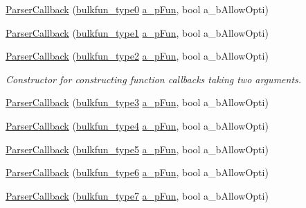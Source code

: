 \begin{DoxyCompactItemize}
\item 
\hyperlink{classmu_1_1_parser_callback_a635bce0e512570b3fc58a0c518c0a670}{Parser\+Callback} (\hyperlink{namespacemu_aff9adf757e90a2398326a3cb10585cf1}{bulkfun\+\_\+type0} \hyperlink{mu_parser_d_l_l_8h_ab3a3ed85edf393f2b8ad69081fe538e8}{a\+\_\+p\+Fun}, bool a\+\_\+b\+Allow\+Opti)
\item 
\hyperlink{classmu_1_1_parser_callback_ae5e973a9b5b89d6cae23b43a0c3b3d34}{Parser\+Callback} (\hyperlink{namespacemu_a2bd588710432e6e34eae3e2af4ba3862}{bulkfun\+\_\+type1} \hyperlink{mu_parser_d_l_l_8h_ab3a3ed85edf393f2b8ad69081fe538e8}{a\+\_\+p\+Fun}, bool a\+\_\+b\+Allow\+Opti)
\item 
\hyperlink{classmu_1_1_parser_callback_a442aafc38e0ea41313c1113aadaccbed}{Parser\+Callback} (\hyperlink{namespacemu_a9faa755ea34c6e8de3895013e649a713}{bulkfun\+\_\+type2} \hyperlink{mu_parser_d_l_l_8h_ab3a3ed85edf393f2b8ad69081fe538e8}{a\+\_\+p\+Fun}, bool a\+\_\+b\+Allow\+Opti)
\begin{DoxyCompactList}\small\item\em Constructor for constructing function callbacks taking two arguments. \end{DoxyCompactList}\item 
\hyperlink{classmu_1_1_parser_callback_a69e08a2bb6d9511159c753e79e5b796f}{Parser\+Callback} (\hyperlink{namespacemu_a441194d09cb0e9331dbfdaf74f59efd3}{bulkfun\+\_\+type3} \hyperlink{mu_parser_d_l_l_8h_ab3a3ed85edf393f2b8ad69081fe538e8}{a\+\_\+p\+Fun}, bool a\+\_\+b\+Allow\+Opti)
\item 
\hyperlink{classmu_1_1_parser_callback_a78d4499313404d45abbafc99045b9e41}{Parser\+Callback} (\hyperlink{namespacemu_a6b7ce6e1f888b02222d2765d1f521507}{bulkfun\+\_\+type4} \hyperlink{mu_parser_d_l_l_8h_ab3a3ed85edf393f2b8ad69081fe538e8}{a\+\_\+p\+Fun}, bool a\+\_\+b\+Allow\+Opti)
\item 
\hyperlink{classmu_1_1_parser_callback_aa9f74c808df33651275e8e10f6065fb8}{Parser\+Callback} (\hyperlink{namespacemu_a9343ce135e0a53897a67c6098d07a7b3}{bulkfun\+\_\+type5} \hyperlink{mu_parser_d_l_l_8h_ab3a3ed85edf393f2b8ad69081fe538e8}{a\+\_\+p\+Fun}, bool a\+\_\+b\+Allow\+Opti)
\item 
\hyperlink{classmu_1_1_parser_callback_a800f5b589bcef69cc990e039ecdb335b}{Parser\+Callback} (\hyperlink{namespacemu_a1259e71ee6f8b9e3985ef0cda16dd433}{bulkfun\+\_\+type6} \hyperlink{mu_parser_d_l_l_8h_ab3a3ed85edf393f2b8ad69081fe538e8}{a\+\_\+p\+Fun}, bool a\+\_\+b\+Allow\+Opti)
\item 
\hyperlink{classmu_1_1_parser_callback_a5483b3ae6eb6329fd742799e0c0cfcd7}{Parser\+Callback} (\hyperlink{namespacemu_a9726be97f12bc3b336884d462623ca8c}{bulkfun\+\_\+type7} \hyperlink{mu_parser_d_l_l_8h_ab3a3ed85edf393f2b8ad69081fe538e8}{a\+\_\+p\+Fun}, bool a\+\_\+b\+Allow\+Opti)

\end{DoxyCompactItemize}
